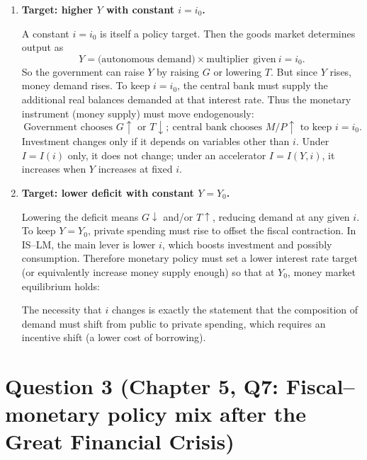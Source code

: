 \documentclass[12pt]{article}
\begin{document}
\begin{enumerate}[label=(\alph*)]
\item \textbf{Target: higher \(Y\) with constant \(i=i_0\).}

A constant \(i=i_0\) is itself a policy target. Then the goods market determines output as
\[
Y = \text{(autonomous demand)} \times \text{multiplier} \ \ \text{given}\ i=i_0.
\]
So the government can raise \(Y\) by raising \(G\) or lowering \(T\). But since \(Y\) rises, money demand rises. To keep \(i=i_0\), the central bank must supply the additional real balances demanded at that interest rate. Thus the monetary instrument (money supply) must move endogenously:
\[
\boxed{\,\text{Government chooses }G\uparrow\text{ or }T\downarrow;\ \text{central bank chooses }M/P\uparrow\text{ to keep }i=i_0.\,}
\]
Investment changes only if it depends on variables other than \(i\). Under \(I=I(i)\) only, it does not change; under an accelerator \(I=I(Y,i)\), it increases when \(Y\) increases at fixed \(i\).

\item \textbf{Target: lower deficit with constant \(Y=Y_0\).}

Lowering the deficit means \(G\downarrow\) and/or \(T\uparrow\), reducing demand at any given \(i\). To keep \(Y=Y_0\), private spending must rise to offset the fiscal contraction. In IS--LM, the main lever is lower \(i\), which boosts investment and possibly consumption. Therefore monetary policy must set a lower interest rate target (or equivalently increase money supply enough) so that at \(Y_0\), money market equilibrium holds:
\begin{center}
\end{center}
The necessity that \(i\) changes is exactly the statement that the composition of demand must shift from public to private spending, which requires an incentive shift (a lower cost of borrowing).
\end{enumerate}

\newpage

\section*{Question 3 (Chapter 5, Q7: Fiscal--monetary policy mix after the Great Financial Crisis)}
\end{document}
